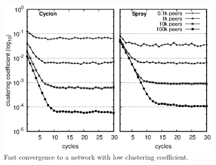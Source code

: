 \begin{figure}
  \begin{center}
    \includegraphics[width=\SCALE\textwidth]{./img/clustering.eps}
    \caption{\label{fig:clustering} Fast convergence to a network with low
      clustering coefficient.}
  \end{center}
\end{figure}

